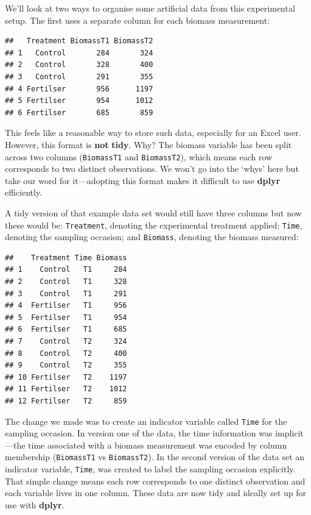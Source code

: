 \documentclass[
]{book}
\begin{document}
We'll look at two ways to organise some artificial data from this experimental setup. The first uses a separate column for each biomass measurement:

\begin{verbatim}
##   Treatment BiomassT1 BiomassT2
## 1   Control       284       324
## 2   Control       328       400
## 3   Control       291       355
## 4 Fertilser       956      1197
## 5 Fertilser       954      1012
## 6 Fertilser       685       859
\end{verbatim}

This feels like a reasonable way to store such data, especially for an Excel user. However, this format is \textbf{not} \textbf{tidy}. Why? The biomass variable has been split across two columns (\texttt{BiomassT1} and \texttt{BiomassT2}), which means each row corresponds to two distinct observations. We won't go into the `whys' here but take our word for it---adopting this format makes it difficult to use \textbf{dplyr} efficiently.

A tidy version of that example data set would still have three columns but now these would be: \texttt{Treatment}, denoting the experimental treatment applied; \texttt{Time}, denoting the sampling occasion; and \texttt{Biomass}, denoting the biomass measured:

\begin{verbatim}
##    Treatment Time Biomass
## 1    Control   T1     284
## 2    Control   T1     328
## 3    Control   T1     291
## 4  Fertilser   T1     956
## 5  Fertilser   T1     954
## 6  Fertilser   T1     685
## 7    Control   T2     324
## 8    Control   T2     400
## 9    Control   T2     355
## 10 Fertilser   T2    1197
## 11 Fertilser   T2    1012
## 12 Fertilser   T2     859
\end{verbatim}

The change we made was to create an indicator variable called \texttt{Time} for the sampling occasion. In version one of the data, the time information was implicit---the time associated with a biomass measurement was encoded by column membership (\texttt{BiomassT1} vs \texttt{BiomassT2}). In the second version of the data set an indicator variable, \texttt{Time}, was created to label the sampling occasion explicitly. That simple change means each row corresponds to one distinct observation and each variable lives in one column. These data are now tidy and ideally set up for use with \textbf{dplyr}.
\end{document}
